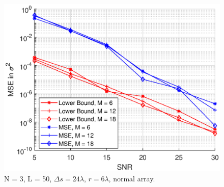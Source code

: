 \documentclass[proposal]{umthesis}          %
\begin{document}
\begin{figure}[H]
	\centering
	\includegraphics[width=0.6\columnwidth]{./results/change_of_sigma_square_L_50}
	\caption{N = 3, L = 50, $\Delta s = 24 \lambda$, $r = 6\lambda$, normal array.}
	\label{fig:effect_sigma_square_50_normal}
\end{figure}




\end{document}
